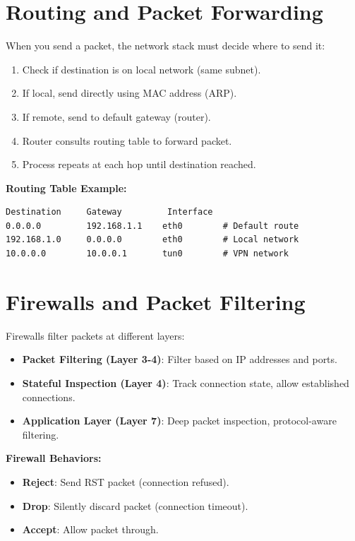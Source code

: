 \section{Routing and Packet Forwarding}

When you send a packet, the network stack must decide where to send it:

\begin{enumerate}
    \item Check if destination is on local network (same subnet).
    \item If local, send directly using MAC address (ARP).
    \item If remote, send to default gateway (router).
    \item Router consults routing table to forward packet.
    \item Process repeats at each hop until destination reached.
\end{enumerate}

\textbf{Routing Table Example:}
\begin{verbatim}
Destination     Gateway         Interface
0.0.0.0         192.168.1.1    eth0        # Default route
192.168.1.0     0.0.0.0        eth0        # Local network
10.0.0.0        10.0.0.1       tun0        # VPN network
\end{verbatim}

\section{Firewalls and Packet Filtering}

Firewalls filter packets at different layers:

\begin{itemize}
    \item \textbf{Packet Filtering (Layer 3-4)}: Filter based on IP addresses and ports.
    \item \textbf{Stateful Inspection (Layer 4)}: Track connection state, allow established connections.
    \item \textbf{Application Layer (Layer 7)}: Deep packet inspection, protocol-aware filtering.
\end{itemize}

\textbf{Firewall Behaviors:}
\begin{itemize}
    \item \textbf{Reject}: Send RST packet (connection refused).
    \item \textbf{Drop}: Silently discard packet (connection timeout).
    \item \textbf{Accept}: Allow packet through.
\end{itemize}

